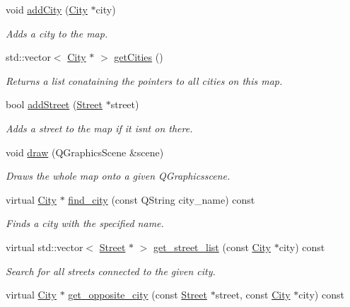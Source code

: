 \begin{DoxyCompactItemize}
\item 
void \hyperlink{class_map_a3313ee9e1dc1bc7e8865ab2c64082ca8}{add\+City} (\hyperlink{class_city}{City} $\ast$city)
\begin{DoxyCompactList}\small\item\em Adds a city to the map. \end{DoxyCompactList}\item 
std\+::vector$<$ \hyperlink{class_city}{City} $\ast$ $>$ \hyperlink{class_map_aac96173f49b430365521708440055772}{get\+Cities} ()
\begin{DoxyCompactList}\small\item\em Returns a list conataining the pointers to all cities on this map. \end{DoxyCompactList}\item 
bool \hyperlink{class_map_a9e5ad7aea193a11e3a5e2f0bb045e818}{add\+Street} (\hyperlink{class_street}{Street} $\ast$street)
\begin{DoxyCompactList}\small\item\em Adds a street to the map if it isn\textquotesingle{}t on there. \end{DoxyCompactList}\item 
void \hyperlink{class_map_af7386ac56bf2ff2d5598ae6e08dc8193}{draw} (Q\+Graphics\+Scene \&scene)
\begin{DoxyCompactList}\small\item\em Draws the whole map onto a given Q\+Graphicsscene. \end{DoxyCompactList}\item 
virtual \hyperlink{class_city}{City} $\ast$ \hyperlink{class_map_acb7d6869cfe4e6e91d3a1c5155ad89b2}{find\+\_\+city} (const Q\+String city\+\_\+name) const
\begin{DoxyCompactList}\small\item\em Finds a city with the specified name. \end{DoxyCompactList}\item 
virtual std\+::vector$<$ \hyperlink{class_street}{Street} $\ast$ $>$ \hyperlink{class_map_a24c8fa29273d26e301f889ab81d696e3}{get\+\_\+street\+\_\+list} (const \hyperlink{class_city}{City} $\ast$city) const
\begin{DoxyCompactList}\small\item\em Search for all streets connected to the given city. \end{DoxyCompactList}\item 
virtual \hyperlink{class_city}{City} $\ast$ \hyperlink{class_map_ac52744dc6f969ca6cdbca96f89d314ed}{get\+\_\+opposite\+\_\+city} (const \hyperlink{class_street}{Street} $\ast$street, const \hyperlink{class_city}{City} $\ast$city) const

\end{DoxyCompactItemize}
